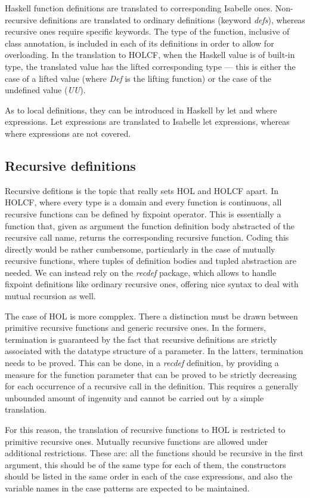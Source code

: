 \documentclass[a4paper,12pt]{article}
\begin{document}
Haskell function definitions are translated to corresponding Isabelle
ones. Non-recursive definitions are translated to ordinary definitions
(keyword \emph{defs}), whereas recursive ones require specific
keywords. The type of the function, inclusive of class annotation, is
included in each of its definitions in order to allow for overloading.
In the translation to HOLCF, when the Haskell value is of built-in
type, the translated value has the lifted corresponding type --- this
is either the case of a lifted value (where \emph{Def} is the lifting
function) or the case of the undefined value (\emph{UU}).

As to local definitions, they can be introduced in Haskell by let and
where expressions. Let expressions are translated to Isabelle let
expressions, whereas where expressions are not covered.


\subsection*{Recursive definitions}

Recursive defitions is the topic that really sets HOL and HOLCF apart.
In HOLCF, where every type is a domain and every function is
continuous, all recursive functions can be defined by fixpoint
operator.  This is essentially a function that, given as argument the
function definition body abstracted of the recursive call name,
returns the corresponding recursive function. Coding this directly
would be rather cumbersome, particularly in the case of mutually
recursive functions, where tuples of definition bodies and tupled
abstraction are needed. We can instead rely on the \emph{recdef}
package, which allows to handle fixpoint definitions like ordinary
recursive ones, offering nice syntax to deal with mutual recursion as
well.

The case of HOL is more compplex. There a distinction must be drawn
between primitive recursive functions and generic recursive ones. In
the formers, termination is guaranteed by the fact that recursive
definitions are strictly associated with the datatype structure of a
parameter. In the latters, termination needs to be proved. This can be
done, in a \emph{recdef} definition, by providing a measure for the
function parameter that can be proved to be strictly decreasing for
each occurrence of a recursive call in the definition. This requires a
generally unbounded amount of ingenuity and cannot be carried out by a
simple translation.

For this reason, the translation of recursive functions to HOL is
restricted to primitive recursive ones. Mutually recursive functions
are allowed under additional restrictions.  These are: all the
functions should be recursive in the first argument, this should be of
the same type for each of them, the constructors should be listed in
the same order in each of the case expressions, and also the variable
names in the case patterns are expected to be maintained.
\end{document}
